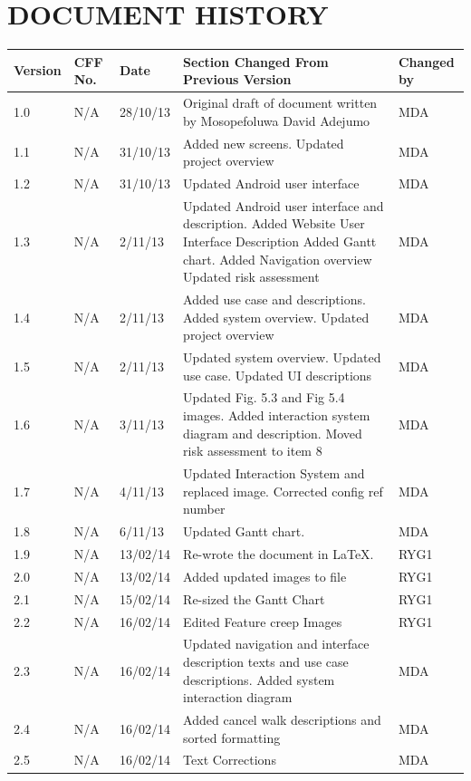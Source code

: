 \documentclass[12pt]{article}
\begin{document}
\section{DOCUMENT HISTORY}
\begin{longtable}{|p{1.5cm}|p{1.5cm}|p{2cm}|p{6cm}| p{2cm}|}
\hline
	Version & CFF No. & Date & Section Changed From Previous Version & Changed by \\
\hline
	1.0 & N/A & 28/10/13 & Original draft of document written by Mosopefoluwa David Adejumo & MDA \\ 
\hline
	1.1 & N/A & 31/10/13 & Added new screens. Updated project overview &MDA \\
\hline
	1.2 & N/A & 31/10/13 & Updated Android user interface & MDA \\
\hline 
	1.3 & N/A & 2/11/13 & Updated Android user interface and description.
Added Website User Interface Description
Added Gantt chart. Added Navigation overview
Updated risk assessment & MDA \\
\hline 
	1.4 & N/A & 2/11/13 & Added use case and descriptions. Added system overview. Updated project overview & MDA \\
\hline 
	1.5 & N/A & 2/11/13 & Updated system overview. Updated use case. Updated UI descriptions & MDA \\
\hline
	1.6 & N/A & 3/11/13 & Updated Fig. 5.3 and Fig 5.4 images. Added interaction system diagram and description.
Moved risk assessment to item 8 & MDA \\
\hline 
	1.7 & N/A & 4/11/13 & Updated Interaction System and replaced image. Corrected config ref number & MDA \\
\hline 
	1.8 & N/A & 6/11/13 & Updated Gantt chart. & MDA \\
\hline	
	1.9 & N/A & 13/02/14 & Re-wrote the document in LaTeX. & RYG1 \\
\hline
	2.0 & N/A & 13/02/14 & Added updated images to file & RYG1 \\
\hline
	2.1	& N/A & 15/02/14 & Re-sized the Gantt Chart & RYG1 \\
\hline
	2.2	& N/A & 16/02/14 & Edited Feature creep Images & RYG1 \\
\hline
	2.3	& N/A & 16/02/14 & Updated navigation and interface description texts and use case descriptions. Added system interaction diagram & MDA \\
\hline
	2.4	& N/A & 16/02/14 & Added cancel walk descriptions and sorted formatting & MDA \\
\hline
\hline
	2.5	& N/A & 16/02/14 & Text Corrections & MDA \\
\hline
\end{longtable}
\end{document}
